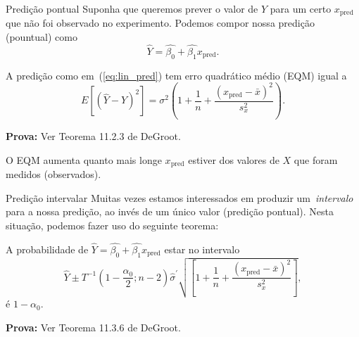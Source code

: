 \begin{frame}{Predição pontual}
Suponha que queremos prever o valor de $Y$ para um certo $x_{\text{pred}}$ que não foi observado no experimento.
Podemos compor nossa predição (pountual) como 
\begin{equation}
 \label{eq:lin_pred}
\hat{Y} = \hat{\beta_0} + \hat{\beta_1}x_{\text{pred}}. 
\end{equation}

\begin{theo}
 A predição como em~(\ref{eq:lin_pred}) tem erro quadrático médio (EQM) igual a
 \[ E\left[\left(\hat{Y} - Y\right)^2\right] = \sigma^2 \left(1 + \frac{1}{n} + \frac{\left(x_{\text{pred}}-\bar{x}\right)^2}{s_x^2}\right). \] 
\end{theo}
\textbf{Prova:} Ver Teorema 11.2.3 de DeGroot.

\begin{obs}
 O EQM aumenta quanto mais longe $x_{\text{pred}}$ estiver dos valores de $X$ que foram medidos (observados).
\end{obs}
\end{frame}

\begin{frame}{Predição intervalar}
Muitas vezes estamos interessados em produzir um~\textit{intervalo} para a nossa predição, ao invés de um único valor (predição pontual). 
Nesta situação, podemos fazer uso do seguinte teorema:
\begin{theo}
A probabilidade de $\hat{Y} = \hat{\beta_0} + \hat{\beta_1}x_{\text{pred}}$ estar no intervalo
\begin{equation*}
 \hat{Y} \pm T^{-1}\left(1-\frac{\alpha_0}{2}; n-2\right)\hat{\sigma}^\prime \sqrt{\left[ 1+ \frac{1}{n} + \frac{\left(x_{\text{pred}}-\bar{x}\right)^2}{s_x^2} \right]},
\end{equation*}
é $1-\alpha_0$.
\end{theo}
\textbf{Prova:} Ver Teorema 11.3.6 de DeGroot.
\end{frame}

